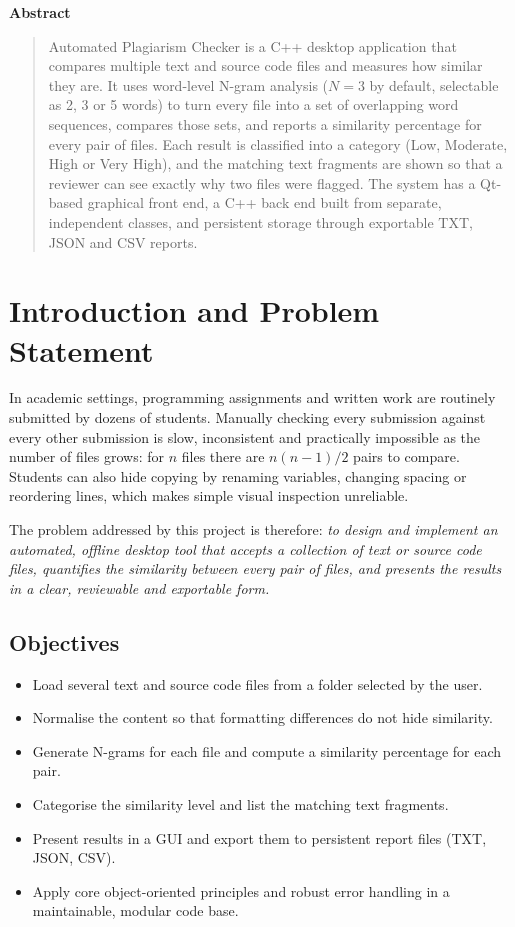 \documentclass[11pt,a4paper]{report}
\begin{document}
\begin{center}\textbf{Abstract}\end{center}
\begin{quotation}\noindent
Automated Plagiarism Checker is a C++ desktop application that compares multiple text and
source code files and measures how similar they are. It uses word-level N-gram analysis
($N=3$ by default, selectable as 2, 3 or 5 words) to turn every file into a set of
overlapping word sequences, compares those sets, and reports a similarity percentage for
every pair of files. Each result is classified into a category (Low, Moderate, High or
Very High), and the matching text fragments are shown so that a reviewer can see exactly
why two files were flagged. The system has a Qt-based graphical front end, a C++ back end
built from separate, independent classes, and persistent storage through exportable TXT,
JSON and CSV reports.
\end{quotation}

\section{Introduction and Problem Statement}

In academic settings, programming assignments and written work are routinely submitted by
dozens of students. Manually checking every submission against every other submission is
slow, inconsistent and practically impossible as the number of files grows: for $n$ files
there are $n(n-1)/2$ pairs to compare. Students can also hide copying by renaming
variables, changing spacing or reordering lines, which makes simple visual inspection
unreliable.

The problem addressed by this project is therefore: \emph{to design and implement an
automated, offline desktop tool that accepts a collection of text or source code files,
quantifies the similarity between every pair of files, and presents the results in a clear,
reviewable and exportable form.}

\subsection{Objectives}
\begin{itemize}[nosep]
  \item Load several text and source code files from a folder selected by the user.
  \item Normalise the content so that formatting differences do not hide similarity.
  \item Generate N-grams for each file and compute a similarity percentage for each pair.
  \item Categorise the similarity level and list the matching text fragments.
  \item Present results in a GUI and export them to persistent report files (TXT, JSON, CSV).
  \item Apply core object-oriented principles and robust error handling in a maintainable,
        modular code base.
\end{itemize}
\end{document}
